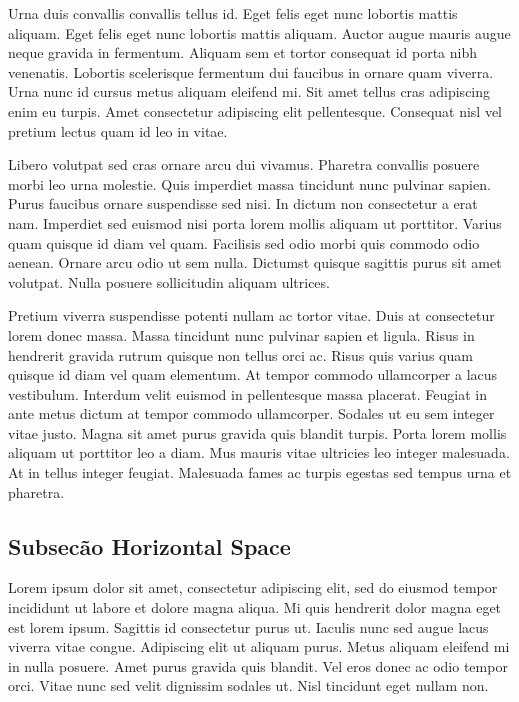 \documentclass[12pt]{article}
\begin{document}
		\begin{onehalfspace} %
			Urna duis convallis convallis tellus id. Eget felis eget nunc lobortis mattis aliquam. Eget felis eget nunc lobortis mattis aliquam. Auctor augue mauris augue neque gravida in fermentum. Aliquam sem et tortor consequat id porta nibh venenatis. Lobortis scelerisque fermentum dui faucibus in ornare quam viverra. Urna nunc id cursus metus aliquam eleifend mi. Sit amet tellus cras adipiscing enim eu turpis. Amet consectetur adipiscing elit pellentesque. Consequat nisl vel pretium lectus quam id leo in vitae.
		\end{onehalfspace}
	
		Libero volutpat sed cras ornare arcu dui vivamus. Pharetra convallis posuere morbi leo urna molestie. Quis imperdiet massa tincidunt nunc pulvinar sapien. Purus faucibus ornare suspendisse sed nisi. In dictum non consectetur a erat nam. Imperdiet sed euismod nisi porta lorem mollis aliquam ut porttitor. Varius quam quisque id diam vel quam. Facilisis sed odio morbi quis commodo odio aenean. Ornare arcu odio ut sem nulla. Dictumst quisque sagittis purus sit amet volutpat. Nulla posuere sollicitudin aliquam ultrices.
			
		\begin{spacing}{0.5} %
			Pretium viverra suspendisse potenti nullam ac tortor vitae. Duis at consectetur lorem donec massa. Massa tincidunt nunc pulvinar sapien et ligula. Risus in hendrerit gravida rutrum quisque non tellus orci ac. Risus quis varius quam quisque id diam vel quam elementum. At tempor commodo ullamcorper a lacus vestibulum. Interdum velit euismod in pellentesque massa placerat. Feugiat in ante metus dictum at tempor commodo ullamcorper. Sodales ut eu sem integer vitae justo. Magna sit amet purus gravida quis blandit turpis. Porta lorem mollis aliquam ut porttitor leo a diam. Mus mauris vitae ultricies leo integer malesuada. At in tellus integer feugiat. Malesuada fames ac turpis egestas sed tempus urna et pharetra.
		\end{spacing}
		
		\singlespacing %
	\subsection{Subsecão Horizontal Space}
		\hspace{0cm}Lorem ipsum dolor sit amet, consectetur adipiscing elit, sed do eiusmod tempor incididunt ut labore et dolore magna aliqua. Mi quis hendrerit dolor magna eget est lorem ipsum. %
		\hspace{1cm}Sagittis id consectetur purus ut. Iaculis nunc sed augue lacus viverra vitae congue. Adipiscing elit ut aliquam purus. Metus aliquam eleifend mi in nulla posuere. 
		\hspace{2cm}Amet purus gravida quis blandit. Vel eros donec ac odio tempor orci. Vitae nunc sed velit dignissim sodales ut. Nisl tincidunt eget nullam non.
		
\end{document}
